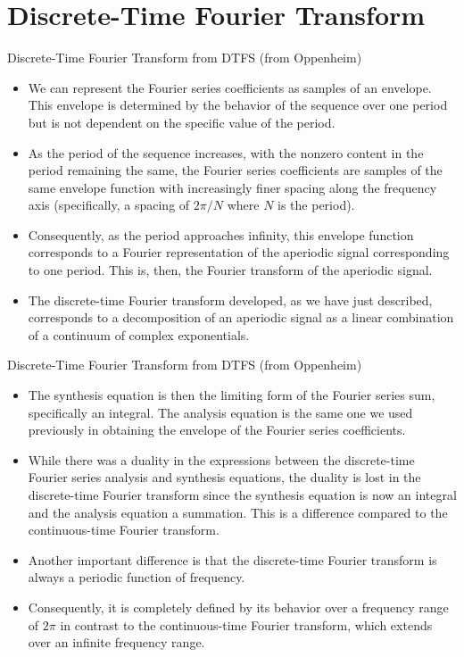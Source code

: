 \section{Discrete-Time Fourier Transform}

\begin{frame}{Discrete-Time Fourier Transform from DTFS (from Oppenheim)}
    \begin{itemize}[<+->]
        \item We can represent the Fourier series coefficients as samples of an envelope. This envelope is determined by the behavior of the sequence over one period but is not dependent on the specific value of the period.
        \item As the period of the sequence increases, with the nonzero content in the period remaining the same, the Fourier series coefficients are samples of the same envelope function with increasingly finer spacing along the frequency axis (specifically, a spacing of $2\pi/N$ where $N$ is the period).
        \item Consequently, as the period approaches infinity, this envelope function corresponds to a Fourier representation of the aperiodic signal corresponding to one period. This is, then, the Fourier transform of the aperiodic signal.
        \item The discrete-time Fourier transform developed, as we have just described, corresponds to a decomposition of an aperiodic signal as a linear combination of a continuum of complex exponentials.
    \end{itemize}
\end{frame}


\begin{frame}{Discrete-Time Fourier Transform from DTFS (from Oppenheim)}
    \begin{itemize}
        \item The synthesis equation is then the limiting form of the Fourier series sum, specifically an integral. The analysis equation is the same one we used previously in obtaining the envelope of the Fourier series coefficients.
        \item While there was a duality in the expressions between the discrete-time Fourier series analysis and synthesis equations, the duality is lost in the discrete-time Fourier transform since the synthesis equation is now an integral and the analysis equation a summation. This is a difference compared to the continuous-time Fourier transform.
        \item Another important difference is that the discrete-time Fourier transform is always a periodic function of frequency.
        \item Consequently, it is completely defined by its behavior over a frequency range of $2\pi$ in contrast to the continuous-time Fourier transform, which extends over an infinite frequency range.
    \end{itemize}
\end{frame}

